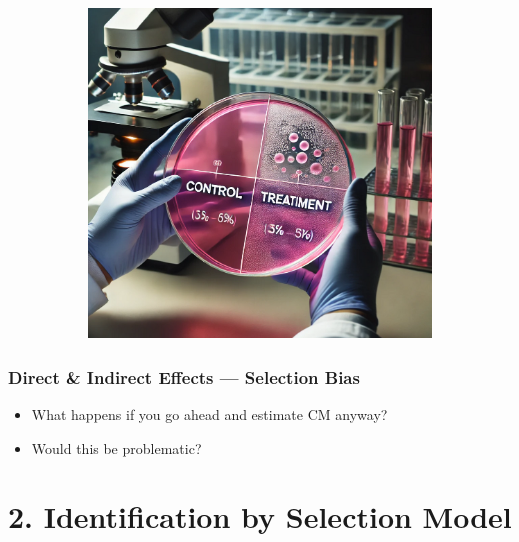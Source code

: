 \documentclass[dvipsnames,handout]{beamer} %
\begin{document}
\begin{frame}[noframenumbering]
\begin{figure}[h!]
\begin{subfigure}[c]{0.475\textwidth}
            \includegraphics[width=\textwidth]{
                presentation-files/headlines/science-lab.png}
        \end{subfigure}
    \end{figure}
\end{frame}
\begin{frame}[noframenumbering]
    \frametitle{Direct \& Indirect Effects --- Selection Bias}
    \begin{itemize}
        \item What happens if you go ahead and estimate CM anyway?
        \item Would this be problematic?
    \end{itemize}
\end{frame}
\section{2. Identification by Selection Model}
\end{document}
